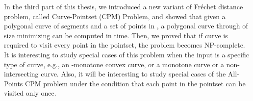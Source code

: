 \documentclass[12pt]{dalthesis}
\newcommand{\REM}[1]{}
\newcommand{\Frechet}{Fr\'echet }
\begin{document}
{In the third part of this thesis, 
we introduced a new variant of
\Frechet distance problem, 
called Curve-Pointset (CPM) Problem, and showed that
given a polygonal curve  of  segments and a set  of  points in , 
a polygonal curve  through  of size  minimizing  
can be computed in  time. 
Then, we proved that if curve 	is required to visit every point in the pointset, 
the problem becomes NP-complete. 
It is interesting to study special cases of 
this problem when the input is a specific 
type of curve, e.g., an -monotone convex curve, 
or a monotone curve or a non-intersecting curve. 
Also, it will be interesting to study special cases 
of the All-Points CPM problem  under the
condition that each point in the pointset 
can be visited only once.
	
	
\REM{	
	At the end, we studied a special case of the last problem  when the input is a convex polygon. 
Many open problems arise from this
work.	An open problem which we would like to mention is whether a polynomial time algorithm could be designed for the case where the input	
to the All-points CPM problem
is some other special type of curves or polygons, for instance, a non-intersecting curve, or a monotone polygon.  
It would be also interesting to study special cases of All-Points CPM problem  under the condition that each point in the pointset can be visited only once or a weight is 
assigned to each point and 
a curve with minimum or maximum weight should be constructed.
}	
\clearpage{}
}



\end{document}
